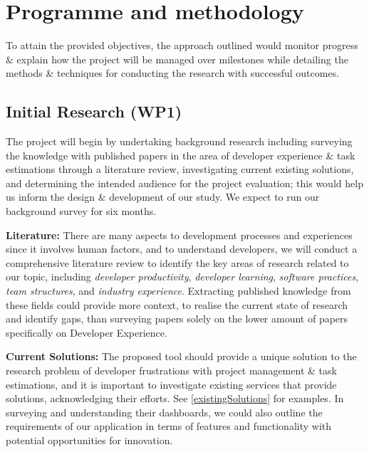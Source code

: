 \documentclass{prrcs}
\begin{document}
\section{Programme and methodology}





To attain the provided objectives, the approach outlined would monitor progress \& explain how the project will be managed over milestones while detailing the methods \& techniques for conducting the research with successful outcomes.

\subsection*{Initial Research (WP1)}

The project will begin by undertaking background research including surveying the knowledge with published papers in the area of developer experience \& task estimations through a literature review, investigating current existing solutions, and determining the intended audience for the project evaluation; this would help us inform the design \& development of our study. We expect to run our background survey for six months.

\textbf{Literature:} There are many aspects to development processes and experiences since it involves human factors, and to understand developers, we will conduct a comprehensive literature review to identify the key areas of research related to our topic, including \textit{developer productivity}, \textit{developer learning}, \textit{software practices}, \textit{team structures}, and \textit{industry experience}. Extracting published knowledge from these fields could provide more context, to realise the current state of research and identify gaps, than surveying papers solely on the lower amount of papers specifically on Developer Experience.

\textbf{Current Solutions:} The proposed tool should provide a unique solution to the research problem of developer frustrations with project management \& task estimations, and it is important to investigate existing services that provide solutions, acknowledging their efforts. See \autoref{existingSolutions} for examples. In surveying and understanding their dashboards, we could also outline the requirements of our application in terms of features and functionality with potential opportunities for innovation.
\end{document}
